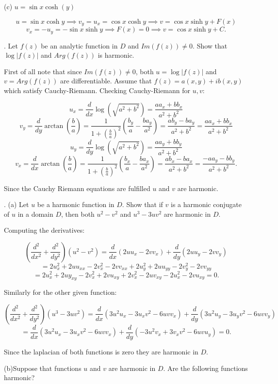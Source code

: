 \documentclass[letterpaper, reqno,11pt]{article}
\begin{document}
(c)  $ u=\sin x \cosh (y)$

\[
u=\sin x\cosh y\implies v_y=u_x=\cos x\cosh y\implies v=\cos x\sinh y+F(x)
\]
\[
v_x=-u_y=-\sin x\sinh y\implies F(x)=0\implies v=\cos x \sinh y+C
.\]

\medskip


.    Let $f(z)$ be an analytic function in $D$ and $ Im (f(z)) \not =0$. Show that $ \log |f (z)|$ and $ Arg (f(z))$ is harmonic.

First of all note that since $Im(f(z))\neq 0$, both $u=\log|f(z)|$ and $v=Arg(f(z))$ are differentiable. Assume that $f(z)=a(x, y)+ib(x, y)$ which satisfy Cauchy-Riemann. Checking Cauchy-Riemann for $u,v$: 

\[
u_x=\frac{d}{dx}\log(\sqrt{ a^2+b^2})=\frac{aa_x+bb_x}{a^2+b^2}
\]
\[
v_y=\frac{d}{dy}\arctan\left(\frac{b}{a}\right)=\frac{1}{1+\left( \frac{b}{a} \right) ^2}\left( \frac{b_y}{a}-\frac{ba_y}{a^2} \right) =\frac{ab_y-ba_y}{a^2+b^2}=\frac{aa_x+bb_x}{a^2+b^2}
\]
\[
u_y=\frac{d}{dy}\log(\sqrt{ a^2+b^2})=\frac{aa_y+bb_y}{a^2+b^2}
\]
\[
v_x=\frac{d}{dx}\arctan\left(\frac{b}{a}\right)=\frac{1}{1+\left( \frac{b}{a} \right) ^2}\left( \frac{b_x}{a}-\frac{ba_x}{a^2} \right) =\frac{ab_x-ba_x}{a^2+b^2}=\frac{-aa_y-bb_y}{a^2+b^2}
.\]

Since the Cauchy Riemann equations are fulfilled $u$ and $v$ are harmonic. 

\medskip

. (a) Let $ u$ be a harmonic function in $D$. Show that if $v$ is a harmonic conjugate of $u$ in a domain $D$, then both $u^2-v^2$ and $ u^3 -3 u v^2$  are harmonic in $D$.

Computing the derivatives: 

\[
\left(\frac{d^2}{dx^2}+\frac{d^2}{dy^2}\right)\left( u^2-v^2 \right)=\frac{d}{dx}(2uu_x-2vv_x )+\frac{d}{dy}(2uu_y-2vv_y )
\]
\[
=2u_{x}^2+2uu_{x x}-2v_x^2-2vv_{x x}+2u_{y}^2+2uu_{y y}-2v_y^2-2vv_{y y}
\]
\[
=2u_{x}^2+2uy_{x y}-2v_x^2+2vu_{x y}+2v_{x}^2-2uv_{x y}-2u_x^2-2vu_{x y}=0
.\]

Similarly for the other given function: 

\[
\left(\frac{d^2}{dx^2}+\frac{d^2}{dy^2}\right)\left( u^3-3uv^2 \right) =\frac{d}{dx}(3u^2u_x-3u_xv^2-6uvv_x)+\frac{d}{dy}(3u^2u_y-3u_yv^2-6uvv_y)
\]
\[
=\frac{d}{dx}(3u^2u_x-3u_xv^2-6uvv_x)+\frac{d}{dy}(-3u^2v_x+3v_xv^2-6uvu_y)=0
.\]

Since the laplacian of both functions is zero they are harmonic in $D$. 

(b)Suppose that functions $u$ and $v$ are harmonic in $D$.  Are the following functions harmonic?
\end{document}
